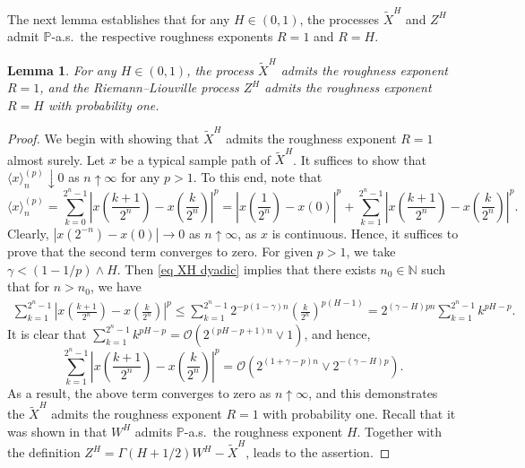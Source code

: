 \documentclass[12pt,reqno]{article}
\def\ua{\uparrow}
\def\da{\downarrow}
\def\wt{\widetilde}
\numberwithin{equation}{section}
\newtheorem{lemma}[theorem]{Lemma}
\theoremstyle{definition}
\def\<{\langle}
\def\>{\rangle}
\def\wt#1{\widetilde{#1}}
\def\ua{\uparrow}
\def\da{\downarrow}
\def\wt{\widetilde}
\newcommand{\bN}{\mathbb{N}}
\newcommand{\bP}{\mathbb{P}}
\begin{document}
The next lemma establishes that for any $H \in (0,1)$, the processes $\wt X^H$ and $Z^H$ admit $\bP$-a.s.~the respective roughness exponents $R = 1$ and $R = H$.

\begin{lemma}\label{lemma XH roughness}
	For any $H \in (0,1)$, the process $\wt X^H$ admits the roughness exponent $R = 1$, and the Riemann--Liouville process $Z^H$ admits the roughness exponent $R = H$ with probability one.
\end{lemma}
\begin{proof}
	We begin with showing that $\wt X^H$ admits the roughness exponent $R = 1$ almost surely. Let $x$ be a typical sample path of $\wt  X^H$. It suffices to show that $\<x\>^{(p)}_n \da 0$ as $n \ua \infty$ for any $p > 1$. To this end, note that 
	\begin{equation*}
		\<x\>^{(p)}_n = \sum_{k = 0}^{2^n-1}\left|x\left(\frac{k+1}{2^n}\right)-x\left(\frac{k}{2^n}\right)\right|^p = |x\left(\frac{1}{2^n}\right) - x\left(0\right)|^p + \sum_{k = 1}^{2^n-1}\left|x\left(\frac{k+1}{2^n}\right)-x\left(\frac{k}{2^n}\right)\right|^p.
	\end{equation*}
	Clearly, $|x(2^{-n}) - x(0)| \rightarrow 0$ as $n \ua \infty$, as $x$ is continuous. Hence, it suffices to prove that the second term converges to zero. For given $p > 1$, we take $\gamma < (1 - 1/p) \wedge H$. Then \eqref{eq XH dyadic} implies that there exists $n_0 \in \bN$ such that for $n > n_0$, we have 
	\begin{equation*}
		\begin{split}
			\sum_{k = 1}^{2^n-1}\left|x\left(\frac{k+1}{2^n}\right)-x\left(\frac{k}{2^n}\right)\right|^p \le \sum_{k = 1}^{2^n-1}2^{-p(1-\gamma)n}\left(\frac{k}{2^n}\right)^{p(H-1)} = 2^{(\gamma - H)pn}\sum_{k = 1}^{2^n-1}k^{pH-p}.
		\end{split}
	\end{equation*}
	It is clear that $\sum_{k = 1}^{2^n-1}k^{pH-p} = \mathcal{O}(2^{(pH-p+1)n} \vee 1)$, and hence, 
	\begin{equation*}
		\sum_{k = 1}^{2^n-1}\left|x\left(\frac{k+1}{2^n}\right)-x\left(\frac{k}{2^n}\right)\right|^p = \mathcal{O}(2^{(1+\gamma-p)n} \vee 2^{-(\gamma -H)p}).
	\end{equation*}
	As a result, the above term converges to zero as $n \ua \infty$, and this demonstrates the $\wt X^H$ admits the roughness exponent $R = 1$ with probability one. Recall that it was shown in \cite[Theorem 5.1]{HanSchiedHurst} that $W^H$ admits $\bP$-a.s.~the roughness exponent $H$. Together with the definition $Z^H = \Gamma(H + 1/2)W^H - \wt X^H$,  leads to the assertion.
\end{proof}
\end{document}
